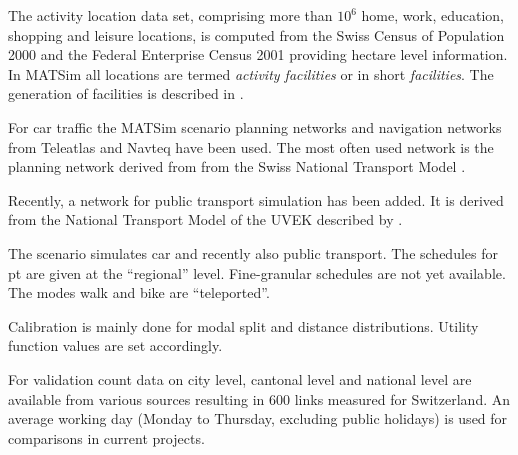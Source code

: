 The activity location data set, comprising more than $10^6$ home, work, education, shopping and leisure locations, is computed from the Swiss Census of Population 2000 and the Federal Enterprise Census 2001 \citep[][]{SwissEnterpriseCensus_manual_2001} providing hectare level information. In MATSim all locations are termed \emph{activity facilities} or in short \emph{facilities}. The generation of facilities is described in \citet[][p.33]{BalmerEtAl_ResRep_bdktzrh_2009}.

For car traffic the MATSim scenario planning networks and navigation networks from Teleatlas \citep[][]{MultiNet_Webpage_2010} and Navteq \citep[][]{Navteq_2011} have been used. The most often used network is the planning network derived from from the Swiss National Transport Model \citep[][]{VrticEtAl_BiegerEtAl_2003}.

Recently, a network for public transport simulation has been added. It is derived from the National Transport Model of the UVEK described by \citet[][]{VrticFroehlich_ResRep_UVEK_2010}. 

The scenario simulates car and recently also public transport. The schedules for pt are given at the ``regional'' level. Fine-granular schedules are not yet available. The modes walk and bike are ``teleported''. 

Calibration is mainly done for modal split and distance distributions. Utility function values are set accordingly.

For validation count data on city level, cantonal level and national level \citep[][]{ASTRA_Webpage_2006} are available from various sources resulting in 600 links measured for Switzerland. An average working day (Monday to Thursday, excluding public holidays) is used for comparisons in current projects.

